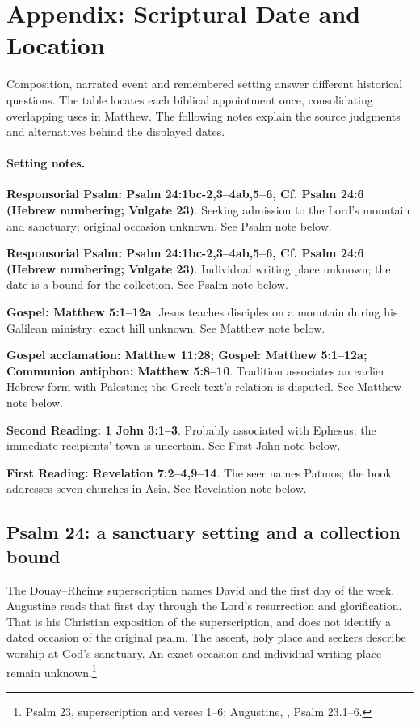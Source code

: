 \section{Appendix: Scriptural Date and Location}
\label{historical-appendix}

Composition, narrated event and remembered setting answer different historical questions. The table locates each biblical appointment once, consolidating overlapping uses in Matthew. The following notes explain the source judgments and alternatives behind the displayed dates.


\paragraph{Setting notes.}
\noindent\textbf{Responsorial Psalm: Psalm 24:1bc-2,3--4ab,5--6, Cf. Psalm 24:6 (Hebrew numbering; Vulgate 23)}. Seeking admission to the Lord's mountain and sanctuary; original occasion unknown. See Psalm note below.

\noindent\textbf{Responsorial Psalm: Psalm 24:1bc-2,3--4ab,5--6, Cf. Psalm 24:6 (Hebrew numbering; Vulgate 23)}. Individual writing place unknown; the date is a bound for the collection. See Psalm note below.

\noindent\textbf{Gospel: Matthew 5:1--12a}. Jesus teaches disciples on a mountain during his Galilean ministry; exact hill unknown. See Matthew note below.

\noindent\textbf{Gospel acclamation: Matthew 11:28; Gospel: Matthew 5:1--12a; Communion antiphon: Matthew 5:8--10}. Tradition associates an earlier Hebrew form with Palestine; the Greek text's relation is disputed. See Matthew note below.

\noindent\textbf{Second Reading: 1 John 3:1--3}. Probably associated with Ephesus; the immediate recipients' town is uncertain. See First John note below.

\noindent\textbf{First Reading: Revelation 7:2--4,9--14}. The seer names Patmos; the book addresses seven churches in Asia. See Revelation note below.


\subsection{Psalm 24: a sanctuary setting and a collection bound}
\label{history-psalm}
The Douay--Rheims superscription names David and the first day of the week. Augustine reads that first day through the Lord's resurrection and glorification. That is his Christian exposition of the superscription, and does not identify a dated occasion of the original psalm. The ascent, holy place and seekers describe worship at God's sanctuary. An exact occasion and individual writing place remain unknown.\footnote{Psalm 23, superscription and verses 1--6; Augustine, , Psalm 23.1--6.}

